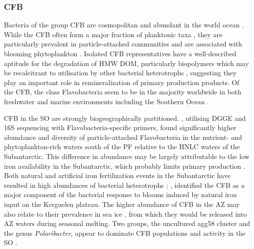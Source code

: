 \subsubsection{CFB}

Bacteria of the group \ac{CFB} are cosmopolitan and abundant in the world ocean \cite{Glockner:1999vm}.
While the \ac{CFB} often form a major fraction of planktonic taxa \cite{Fandino:2001uw}, they are particularly prevalent in particle-attached communities \cite{DeLong:1993uu} and are associated with blooming phytoplankton \cite{Pinhassi:2004is}.
Isolated \ac{CFB} representatives have a well-described aptitude for the degradation of \ac{HMW} \ac{DOM}, particularly biopolymers which may be recalcitrant to utilisation by other bacterial heterotrophs \citep[reviewed in][]{Kirchman:2002ub}, suggesting they play an important role in remineralization of primary production products.
Of the \ac{CFB}, the class Flavobacteria seem to be in the majority worldwide in both freshwater and marine environments \cite{OSullivan:2006km,Cottrell:2005bo} including the Southern Ocean \cite{Abell:2005ji}.

\ac{CFB} in the \ac{SO} are strongly biogeographically partitioned.
\citet{Abell:2005ji}, utilising \ac{DGGE} and 16S sequencing with Flavobacteria-specific primers, found significantly higher abundance and diversity of particle-attached Flavobacteria in the nutrient- and phytoplankton-rich waters south of the \ac{PF} relative to the \ac{HNLC} waters of the Subantarctic.
This difference in abundance may be largely attributable to the low iron availability in the Subantarctic, which probably limits primary production \cite{Boyd:2007ij}.
Both natural and artificial iron fertilization events in the Subantarctic have resulted in high abundances of bacterial heterotrophs \cite{Christaki:2008el,Oliver:2004ty}; \citet{West:2008kc}, identified the \ac{CFB} as a major component of the bacterial response to blooms induced by natural iron input on the Kerguelen plateau.
The higher abundance of \ac{CFB} in the \ac{AZ} may also relate to their prevalence in sea ice \cite{Brinkmeyer:2003iq,Brown:2001hh}, from which they would be released into \ac{AZ} waters during seasonal melting.
Two groups, the uncultured agg58 cluster and the genus \emph{Polaribacter}, appear to dominate \ac{CFB} populations and activity in the \ac{SO} \cite{Murray:2007db,Abell:2005ji,Abell:dh,Obernosterer:2011df,West:2008kc,Ghiglione:2011ee,Ducklow:2011jl,Straza:2010io}.

